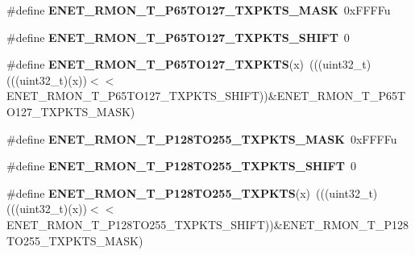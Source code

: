 \begin{DoxyCompactItemize}
\item 
\#define {\bfseries E\+N\+E\+T\+\_\+\+R\+M\+O\+N\+\_\+\+T\+\_\+\+P65\+T\+O127\+\_\+\+T\+X\+P\+K\+T\+S\+\_\+\+M\+A\+SK}~0x\+F\+F\+F\+Fu\hypertarget{group__ENET__Register__Masks_gaebb8723106917311976e5e457d535e81}{}\label{group__ENET__Register__Masks_gaebb8723106917311976e5e457d535e81}

\item 
\#define {\bfseries E\+N\+E\+T\+\_\+\+R\+M\+O\+N\+\_\+\+T\+\_\+\+P65\+T\+O127\+\_\+\+T\+X\+P\+K\+T\+S\+\_\+\+S\+H\+I\+FT}~0\hypertarget{group__ENET__Register__Masks_ga76051106460eb4da2d6c1349785902bf}{}\label{group__ENET__Register__Masks_ga76051106460eb4da2d6c1349785902bf}

\item 
\#define {\bfseries E\+N\+E\+T\+\_\+\+R\+M\+O\+N\+\_\+\+T\+\_\+\+P65\+T\+O127\+\_\+\+T\+X\+P\+K\+TS}(x)~(((uint32\+\_\+t)(((uint32\+\_\+t)(x))$<$$<$E\+N\+E\+T\+\_\+\+R\+M\+O\+N\+\_\+\+T\+\_\+\+P65\+T\+O127\+\_\+\+T\+X\+P\+K\+T\+S\+\_\+\+S\+H\+I\+FT))\&E\+N\+E\+T\+\_\+\+R\+M\+O\+N\+\_\+\+T\+\_\+\+P65\+T\+O127\+\_\+\+T\+X\+P\+K\+T\+S\+\_\+\+M\+A\+SK)\hypertarget{group__ENET__Register__Masks_gaa6a23d4dd439429ea0e8393c80a1b540}{}\label{group__ENET__Register__Masks_gaa6a23d4dd439429ea0e8393c80a1b540}

\item 
\#define {\bfseries E\+N\+E\+T\+\_\+\+R\+M\+O\+N\+\_\+\+T\+\_\+\+P128\+T\+O255\+\_\+\+T\+X\+P\+K\+T\+S\+\_\+\+M\+A\+SK}~0x\+F\+F\+F\+Fu\hypertarget{group__ENET__Register__Masks_gacd52bd7bd4b45906ad5f62ca31f3edda}{}\label{group__ENET__Register__Masks_gacd52bd7bd4b45906ad5f62ca31f3edda}

\item 
\#define {\bfseries E\+N\+E\+T\+\_\+\+R\+M\+O\+N\+\_\+\+T\+\_\+\+P128\+T\+O255\+\_\+\+T\+X\+P\+K\+T\+S\+\_\+\+S\+H\+I\+FT}~0\hypertarget{group__ENET__Register__Masks_ga6ff37e25aa7ff61367f6637d29189b89}{}\label{group__ENET__Register__Masks_ga6ff37e25aa7ff61367f6637d29189b89}

\item 
\#define {\bfseries E\+N\+E\+T\+\_\+\+R\+M\+O\+N\+\_\+\+T\+\_\+\+P128\+T\+O255\+\_\+\+T\+X\+P\+K\+TS}(x)~(((uint32\+\_\+t)(((uint32\+\_\+t)(x))$<$$<$E\+N\+E\+T\+\_\+\+R\+M\+O\+N\+\_\+\+T\+\_\+\+P128\+T\+O255\+\_\+\+T\+X\+P\+K\+T\+S\+\_\+\+S\+H\+I\+FT))\&E\+N\+E\+T\+\_\+\+R\+M\+O\+N\+\_\+\+T\+\_\+\+P128\+T\+O255\+\_\+\+T\+X\+P\+K\+T\+S\+\_\+\+M\+A\+SK)\hypertarget{group__ENET__Register__Masks_gac5d941cee86d2827cbbb7a52cbb771dd}{}\label{group__ENET__Register__Masks_gac5d941cee86d2827cbbb7a52cbb771dd}


\end{DoxyCompactItemize}
